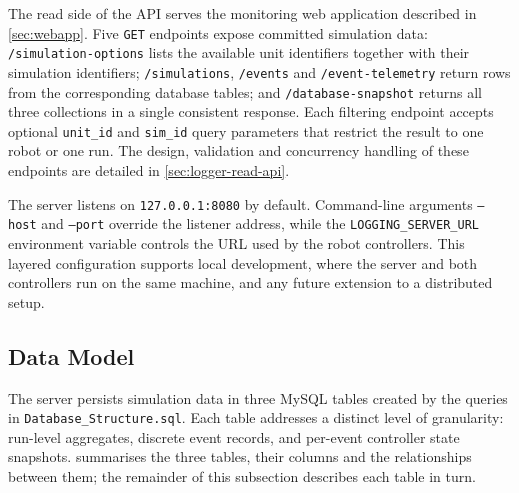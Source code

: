 The read side of the API serves the monitoring web application described in \cref{sec:webapp}. Five \texttt{GET} endpoints expose committed simulation data: \texttt{/simulation-options} lists the available unit identifiers together with their simulation identifiers; \texttt{/simulations}, \texttt{/events} and \texttt{/event-telemetry} return rows from the corresponding database tables; and \texttt{/database-snapshot} returns all three collections in a single consistent response. Each filtering endpoint accepts optional \texttt{unit\_id} and \texttt{sim\_id} query parameters that restrict the result to one robot or one run. The design, validation and concurrency handling of these endpoints are detailed in \cref{sec:logger-read-api}.

The server listens on \texttt{127.0.0.1:8080} by default. Command-line arguments \texttt{--host} and \texttt{--port} override the listener address, while the \texttt{LOGGING\_SERVER\_URL} environment variable controls the URL used by the robot controllers. This layered configuration supports local development, where the server and both controllers run on the same machine, and any future extension to a distributed setup.

\subsection{Data Model}
\label{sec:logger-data-model}

The server persists simulation data in three MySQL tables created by the queries in \texttt{Database\_Structure.sql}. Each table addresses a distinct level of granularity: run-level aggregates, discrete event records, and per-event controller state snapshots.  summarises the three tables, their columns and the relationships between them; the remainder of this subsection describes each table in turn.

